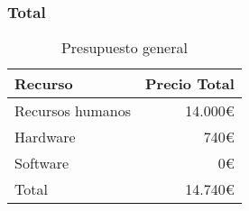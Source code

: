 \subsubsection{Total}
\begin{table}
    \centering
    \begin{tabular}[ht]{l|r} 
        \textbf{Recurso} & \textbf{Precio Total} \\
        \hline
        Recursos humanos & 14.000\euro   \\
        Hardware         & 740\euro   \\
        Software         & 0\euro   \\
        \hline
        Total           & 14.740\euro   \\
    \end{tabular}
    \caption{Presupuesto general}
    \label{tab:total-budget}
\end{table}

\pagebreak